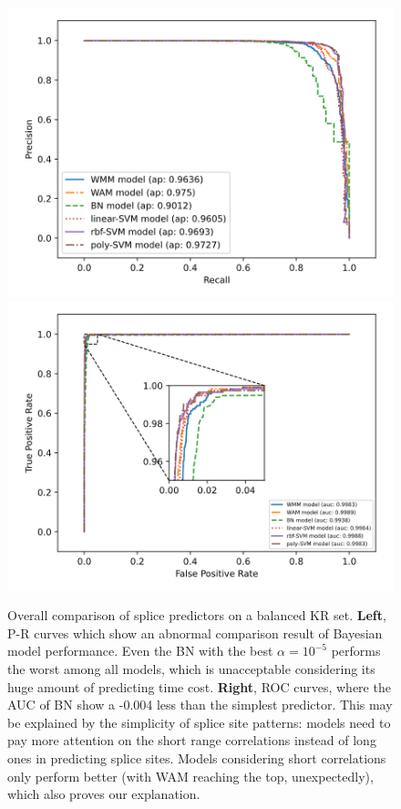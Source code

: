 \documentclass[journal,twoside]{IEEEtran}
\begin{document}
\begin{figure}[htbp]
\centerline{\includegraphics[scale=0.28]{Pics/all_prcurve_donor.png}
    \includegraphics[scale=0.28]{Pics/all_roccurve_donor.png}}
\caption{Overall comparison of splice predictors on a balanced KR set. \textbf{Left}, P-R curves which show an abnormal comparison result of Bayesian model performance. Even the BN with the best $\alpha = 10^{-5}$ performs the worst among all models, which is unacceptable considering its huge amount of predicting time cost. \textbf{Right}, ROC curves, where the AUC of BN show a -0.004 less than the simplest predictor. This may be explained by the simplicity of splice site patterns: models need to pay more attention on the short range correlations instead of long ones in predicting splice sites. Models considering short correlations only perform better (with WAM reaching the top, unexpectedly), which also proves our explanation. }
\label{fig5}
\end{figure}
\end{document}
